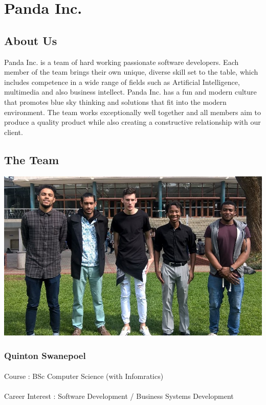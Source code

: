 \documentclass[11pt]{article}
\begin{document}
\newpage
\tableofcontents
\newpage

\section{Panda Inc.}
\subsection{About Us}
Panda Inc. is a team of hard working passionate software developers. Each member of the team brings their own unique, diverse skill set to the table, which includes competence in a wide range of fields such as Artificial Intelligence, multimedia and also business intellect. Panda Inc. has a fun and modern culture that promotes blue sky thinking and solutions that fit into the modern environment. The team works exceptionally well together and all members aim to produce a quality product while also creating a constructive relationship with our client.

\subsection{The Team}
\includegraphics[width=\textwidth]{Images/Team_Pic.jpg}

\subsubsection{Quinton Swanepoel} 
\paragraph{}Course : BSc Computer Science (with Infomratics)
\paragraph{}Career Interest : Software Development / Business Systems Development  
\end{document}
